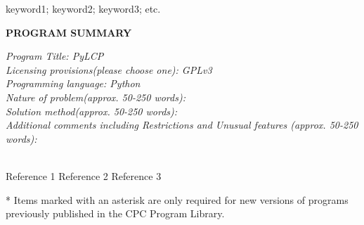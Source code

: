\documentclass[final,5p,times,twocolumn]{elsarticle}
\begin{document}
\begin{frontmatter}
\begin{abstract}
In addition to the manuscript you must supply: the program source code; job control scripts, where applicable; a README file giving the names and a brief description of all the files that make up the package and clear instructions on the installation and execution of the program; sample input and output data for at least one comprehensive test run; and, where appropriate, a user manual. These should be sent, via email as a compressed archive file, to the CPC Program Librarian at cpc@qub.ac.uk.

\end{abstract}

\begin{keyword}
keyword1; keyword2; keyword3; etc.

\end{keyword}

\end{frontmatter}



{\bf PROGRAM SUMMARY}

\begin{small}
\noindent
{\em Program Title: PyLCP}                                          \\
{\em Licensing provisions(please choose one): GPLv3}                                   \\
{\em Programming language: Python}                                   \\

{\em Nature of problem(approx. 50-250 words):}\\
{\em Solution method(approx. 50-250 words):}\\
{\em Additional comments including Restrictions and Unusual features (approx. 50-250 words):}\\
   \\

\begin{thebibliography}{0}
Reference 1         %
Reference 2         %
Reference 3         %
\end{thebibliography}
* Items marked with an asterisk are only required for new versions
of programs previously published in the CPC Program Library.\\
\end{small}
\end{document}
